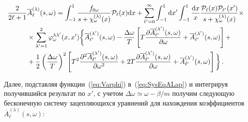 \documentclass[14pt, russian]{article}
\newcommand{\dd}{\mathrm{d}} %
\begin{document}
\begin{equation}\label{eq:SysEqALap}
\begin{aligned}
\frac{2}{2 \ell +1} &\overline{A}_\ell^{(\lambda)}(s,\omega) = \int_{-1}^{1} \frac{f_{0\omega}}{s+{\cal \chi}^{(\lambda)}_\omega(x)}{\cal P}_\ell(x)\dd x+
\sum_{\ell'=0}^{\infty}\int_{-1}^{1}\dd x'\int_{-1}^{1}\frac{\dd x}{x} \frac{{\cal P}_\ell(x) {\cal P}_{\ell'}(x')}{s+{\cal \chi}_\omega^{(\lambda)}(x)} \times
\\
&\times\sum_{\lambda'=1}^2\varphi_\omega^{\lambda\lambda'}(x,x')\bigg\{ \overline{A}_{\ell'}^{(\lambda')}(s,\omega) - \frac{\Delta \omega}{T}
\left[
T \frac{\partial \overline{A}_{\ell'}^{(\lambda')}(s,\omega)}{\partial \omega} + \overline{A}_{\ell'}^{(\lambda')}(s,\omega)
\right]+
\\
&+ \frac{1}{2}\left(\frac{\Delta \omega}{T}\right)^2
\left[
T^2 \frac{\partial^2 \overline{A}_{\ell'}^{(\lambda')}(s,\omega)}{\partial \omega^2} + 2T \frac{\partial \overline{A}_{\ell'}^{(\lambda')}(s,\omega)}{\partial \omega}+\overline{A}_{\ell'}^{(\lambda')}(s,\omega)
\right]\bigg\}\, .
\end{aligned}
\end{equation}

Далее, подставляя функции~(\ref{eq:Varphi}) в~(\ref{eq:SysEqALap}) и интегрируя получившийся результат по $x'$, с учетом $\Delta\omega\simeq \omega -\beta/m$ получим следующую бесконечную  систему зацепляющихся уравнений для нахождения коэффициентов $\overline{A}_\ell^{(\lambda)}(s,\omega)$:
\end{document}
